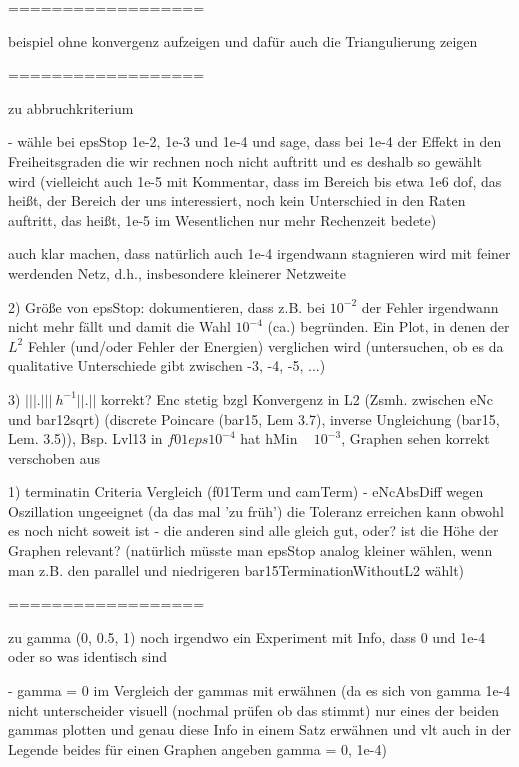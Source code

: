 ==================

beispiel ohne konvergenz aufzeigen und dafür auch die Triangulierung zeigen

==================

zu abbruchkriterium

  - wähle bei epsStop 1e-2, 1e-3 und 1e-4 und sage, dass bei 1e-4 der Effekt 
    in den Freiheitsgraden die wir rechnen noch nicht auftritt und es deshalb
    so gewählt wird (vielleicht auch 1e-5 mit Kommentar, dass im Bereich bis 
    etwa 1e6 dof, das heißt, der Bereich der uns interessiert, noch kein 
    Unterschied in den Raten auftritt, das heißt, 1e-5 im Wesentlichen nur 
    mehr Rechenzeit bedete)
    
    auch klar machen, dass natürlich auch 1e-4 irgendwann stagnieren wird mit 
    feiner werdenden Netz, d.h., insbesondere kleinerer Netzweite

2) Größe von epsStop: dokumentieren, dass z.B. bei $10^{-2}$ der Fehler irgendwann
nicht mehr fällt und damit die Wahl $10^{-4}$ (ca.) begründen.
Ein Plot, in denen der $L^2$ Fehler (und/oder Fehler der Energien) verglichen wird
(untersuchen, ob es da qualitative Unterschiede gibt zwischen -3, -4, -5, ...)

3) $|||.||| ~ h^{-1} ||.||$ korrekt? Enc stetig bzgl Konvergenz in L2 (Zsmh. 
   zwischen eNc und bar12sqrt)
   (discrete Poincare (bar15, Lem 3.7), inverse Ungleichung (bar15, Lem. 3.5)),
   Bsp. Lvl13 in $f01eps10^{-4}$ hat hMin ~ $10^{-3}$, Graphen sehen korrekt
   verschoben aus


1) terminatin Criteria Vergleich (f01Term und camTerm)
    - eNcAbsDiff wegen Oszillation ungeeignet (da das mal 'zu früh') die 
      Toleranz erreichen kann obwohl es noch nicht soweit ist
    - die anderen sind alle gleich gut, oder? ist die Höhe der Graphen relevant?
      (natürlich müsste man epsStop analog kleiner wählen, wenn man z.B. den
      parallel und niedrigeren bar15TerminationWithoutL2 wählt)

==================

zu gamma (0, 0.5, 1) noch irgendwo ein Experiment mit Info, dass 0 und 1e-4 oder
so was identisch sind

  - gamma = 0 im Vergleich der gammas mit erwähnen (da es sich von gamma 1e-4
    nicht unterscheider visuell (nochmal prüfen ob das stimmt) nur eines der
    beiden gammas plotten und genau diese Info in einem Satz erwähnen und vlt
    auch in der Legende beides für einen Graphen angeben gamma = 0, 1e-4)


